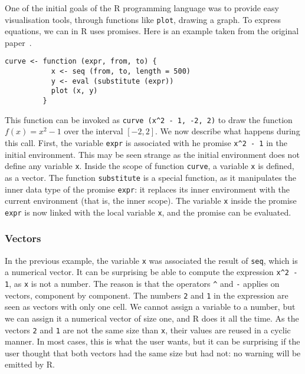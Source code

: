 \documentclass{article}
\newcommand\R{R}
\begin{document}
One of the initial goals of the \R{} programming language
was to provide easy visualisation tools,
through functions like \texttt{plot},
drawing a graph.
To express equations, we can in \R{} uses promises.
Here is an example taken from the original paper~\parencite{ihaka1996r}.
\begin{verbatim}
curve <- function (expr, from, to) {
           x <- seq (from, to, length = 500)
           y <- eval (substitute (expr))
           plot (x, y)
         }
\end{verbatim}
This function can be invoked as
\texttt{curve (x^2 - 1, -2, 2)}
to draw the function \(f(x) = x^2 - 1\)
over the interval \([-2, 2]\).
We now describe what happens during
this call.
First, the variable \texttt{expr}
is associated with he promise \texttt{x^2 - 1}
in the initial environment.
This may be seen strange as the initial environment
does not define any variable \texttt{x}.
Inside the scope of function \texttt{curve},
a variable \texttt{x} is defined, as a vector.
The function \texttt{substitute} is a special function,
as it manipulates the inner data type of the promise \texttt{expr}:
it replaces its inner environment with the current environment
(that is, the inner scope).
The variable \texttt{x} inside the promise
\texttt{expr} is now linked with the local
variable \texttt{x},
and the promise can be evaluated.


\subsubsection{Vectors}
\label{sec:vectors}

In the previous example,
the variable \texttt{x} was associated the result
of \texttt{seq}, which is a numerical vector.
It can be surprising be able to compute
the expression \texttt{x^2 - 1},
as \texttt{x} is not a number.
The reason is that the operators \texttt{^} and \texttt{-}
applies on vectors, component by component.
The numbers \texttt{2} and \texttt{1}
in the expression are seen as vectors with only one cell.
We cannot assign a variable to a number,
but we can assign it a numerical vector of size one,
and \R{} does it all the time.
As the vectors \texttt{2} and \texttt{1}
are not the same size than \texttt{x},
their values are reused in a cyclic manner.
In most cases, this is what the user wants,
but it can be surprising if the user thought that both
vectors had the same size but had not:
no warning will be emitted by \R{}.
\end{document}
